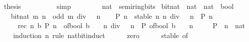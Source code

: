 \begin{isabellebody}
\ {\isacharquery}{\kern0pt}thesis\isanewline
\ \ \ \ \ \ \ \ \isamarkupfalse%
\ simp\isanewline
\ \ \ \ \isamarkupfalse%
\isanewline
\ \ \isamarkupfalse%
\isanewline
{}\isamarkupfalse%
%
\endisatagproof
{\isafoldproof}%
%
\isadelimproof
\isanewline
%
\endisadelimproof
\isanewline
{}\isamarkupfalse%
\ nat\ {\isacharcolon}{\kern0pt}{\isacharcolon}{\kern0pt}\ semiring{\isacharunderscore}{\kern0pt}bits\isanewline
{}\isanewline
\isanewline
{}\isamarkupfalse%
\ bit{\isacharunderscore}{\kern0pt}nat\ {\isacharcolon}{\kern0pt}{\isacharcolon}{\kern0pt}\ {\isacartoucheopen}nat\ {\isasymRightarrow}\ nat\ {\isasymRightarrow}\ bool{\isacartoucheclose}\isanewline
\ \ \ {\isacartoucheopen}bit{\isacharunderscore}{\kern0pt}nat\ m\ n\ {\isasymlongleftrightarrow}\ odd\ {\isacharparenleft}{\kern0pt}m\ div\ {}\ {\isacharcircum}{\kern0pt}\ n{\isacharparenright}{\kern0pt}{\isacartoucheclose}\isanewline
\isanewline
{}\isamarkupfalse%
\isanewline
%
\isadelimproof
%
\endisadelimproof
%
\isatagproof
{}\isamarkupfalse%
\isanewline
\ \ \isamarkupfalse%
\ {\isacartoucheopen}P\ n{\isacartoucheclose}\ \ stable{\isacharcolon}{\kern0pt}\ {\isacartoucheopen}{\isasymAnd}n{\isachardot}{\kern0pt}\ n\ div\ {}\ {\isacharequal}{\kern0pt}\ n\ {\isasymLongrightarrow}\ P\ n{\isacartoucheclose}\isanewline
\ \ \ \ \ rec{\isacharcolon}{\kern0pt}\ {\isacartoucheopen}{\isasymAnd}n\ b{\isachardot}{\kern0pt}\ P\ n\ {\isasymLongrightarrow}\ {\isacharparenleft}{\kern0pt}of{\isacharunderscore}{\kern0pt}bool\ b\ {\isacharplus}{\kern0pt}\ {}\ {\isacharasterisk}{\kern0pt}\ n{\isacharparenright}{\kern0pt}\ div\ {}\ {\isacharequal}{\kern0pt}\ n\ {\isasymLongrightarrow}\ P\ {\isacharparenleft}{\kern0pt}of{\isacharunderscore}{\kern0pt}bool\ b\ {\isacharplus}{\kern0pt}\ {}\ {\isacharasterisk}{\kern0pt}\ n{\isacharparenright}{\kern0pt}{\isacartoucheclose}\isanewline
\ \ \ \ \ P\ \ n\ {\isacharcolon}{\kern0pt}{\isacharcolon}{\kern0pt}\ nat\isanewline
\ \ \isamarkupfalse%
\ {\isacharparenleft}{\kern0pt}induction\ n\ rule{\isacharcolon}{\kern0pt}\ nat{\isacharunderscore}{\kern0pt}bit{\isacharunderscore}{\kern0pt}induct{\isacharparenright}{\kern0pt}\isanewline
\ \ \ \ \isamarkupfalse%
\ zero\isanewline
\ \ \ \ \isamarkupfalse%
\ stable\ {\isacharbrackleft}{\kern0pt}of\ {}{\isacharbrackright}{\kern0pt}\ \isamarkupfalse%

\end{isabellebody}
